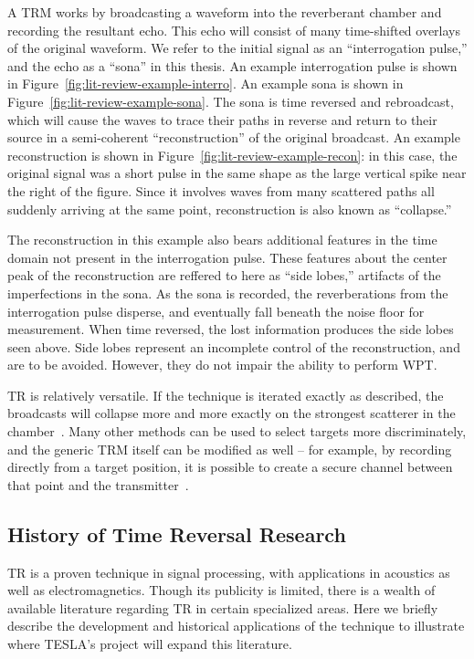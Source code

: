 A TRM works by broadcasting a waveform into the reverberant chamber and recording the resultant echo. This echo will consist of many time-shifted overlays of the original waveform. We refer to the initial signal as an ``interrogation pulse,'' and the echo as a ``sona'' in this thesis. An example interrogation pulse is shown in Figure~\ref{fig:lit-review-example-interro}. An example sona is shown in Figure~\ref{fig:lit-review-example-sona}. The sona is time reversed and rebroadcast, which will cause the waves to trace their paths in reverse and return to their source in a semi-coherent ``reconstruction'' of the original broadcast. An example reconstruction is shown in Figure~\ref{fig:lit-review-example-recon}: in this case, the original signal was a short pulse in the same shape as the large vertical spike near the right of the figure. Since it involves waves from many scattered paths all suddenly arriving at the same point, reconstruction is also known as ``collapse.''

The reconstruction in this example also bears additional features in the time domain not present in the interrogation pulse. These features about the center peak of the reconstruction are reffered to here as ``side lobes,'' artifacts of the imperfections in the sona. As the sona is recorded, the reverberations from the interrogation pulse disperse, and eventually fall beneath the noise floor for measurement. When time reversed, the lost information produces the side lobes seen above. Side lobes represent an incomplete control of the reconstruction, and are to be avoided. However, they do not impair the ability to perform WPT.

TR is relatively versatile. If the technique is iterated exactly as described, the broadcasts will collapse more and more exactly on the strongest scatterer in the chamber~\cite{fink_time-reversed_1999}. Many other methods can be used to select targets more discriminately, and the generic TRM itself can be modified as well -- for example, by recording directly from a target position, it is possible to create a secure channel between that point and the transmitter~\cite{nltr-wave-chaotic}.

\subsection{History of Time Reversal Research}

TR is a proven technique in signal processing, with applications in acoustics as well as electromagnetics. Though its publicity is limited, there is a wealth of available literature regarding TR in certain specialized areas. Here we briefly describe the development and historical applications of the technique to illustrate where TESLA's project will expand this literature.

